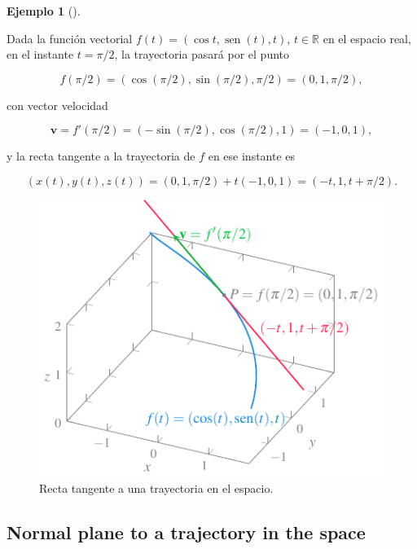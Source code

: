 \documentclass[
  a4paper,
]{scrreport}
\theoremstyle{definition}
\newtheorem{example}{Ejemplo}[chapter]
\theoremstyle{plain}
\theoremstyle{plain}
\theoremstyle{plain}
\theoremstyle{definition}
\theoremstyle{remark}
\begin{document}
\begin{example}[]\protect\hypertarget{exm-tangente-trayectoria-espacio}{}\label{exm-tangente-trayectoria-espacio}

Dada la función vectorial \(f(t)=(\cos t, \operatorname{sen}(t), t)\),
\(t\in \mathbb{R}\) en el espacio real, en el instante \(t=\pi/2\), la
trayectoria pasará por el punto

\[
f(\pi/2)=(\cos(\pi/2),\sin(\pi/2),\pi/2)=(0,1,\pi/2),
\]

con vector velocidad

\[
\mathbf{v}=f'(\pi/2)=(-\sin(\pi/2),\cos(\pi/2), 1)=(-1,0,1),
\]

y la recta tangente a la trayectoria de \(f\) en ese instante es

\[
(x(t),y(t),z(t))=(0,1,\pi/2)+t(-1,0,1) = (-t,1,t+\pi/2).
\]

\begin{figure}

{\centering \includegraphics{img/derivadas-funciones-vectoriales/tangente-trayectoria-espacio.pdf}

}

\caption{Recta tangente a una trayectoria en el espacio.}

\end{figure}

\end{example}

\hypertarget{normal-plane-to-a-trajectory-in-the-space}{%
\subsection{Normal plane to a trajectory in the
space}\label{normal-plane-to-a-trajectory-in-the-space}}
\end{document}
